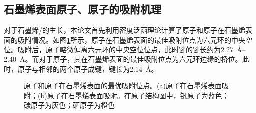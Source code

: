     \subsection{石墨烯表面原子、原子的吸附机理}
    \label{cap:VS}
    对于石墨烯/的生长，本论文首先利用密度泛函理论计算了原子和原子在石墨烯表面的吸附情况。如图\ref{fig:VS_VandSeOnG}所示，原子在石墨烯表面的最佳吸附位点为六元环的中央空位。吸附后，原子略微偏离六元环的中央空位位点，此时键的键长约为\SIrange[range-phrase=$\sim$]{2.27}{2.40}{\angstrom}。而对于原子，其在石墨烯表面的最佳吸附位点为六元环边缘的桥位。此时，原子与相邻的两个原子成键，键长为\SI{2.14}{\angstrom}。

    \begin{figure}[htb]
        \caption{原子和原子在石墨烯表面的最优吸附位点。(a)原子在石墨烯表面吸附；(b)原子在石墨烯表面吸附。在原子结构图中，钒原子为蓝色；碳原子为灰色；硒原子为橙色}
        \label{fig:VS_VandSeOnG}
    \end{figure}

